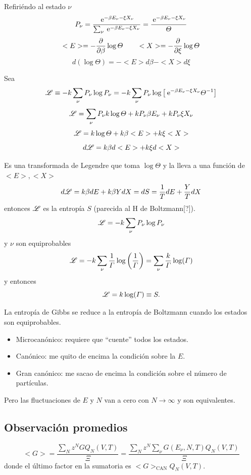 \documentclass[10pt,oneside]{CBFT_book}
\begin{document}
Refiriéndo al estado $ \nu $
\[
	P_\nu = \frac{ \:\mathrm{e}^{-\beta E_\nu - \xi X_\nu } }{ \sum_\nu \:\mathrm{e}^{-\beta E_\nu - \xi X_\nu } } =
	\frac{ \:\mathrm{e}^{-\beta E_\nu - \xi X_\nu }}{\Theta}
\]
\[
	<E> = -\frac{\partial^{\hspace{-0.05em}} {}}{\partial {\beta}^{\hspace{-0.05em}}} \log \Theta  \qquad <X> = -\frac{\partial^{\hspace{-0.05em}} {}}{\partial {\xi}^{\hspace{-0.05em}}} \log \Theta 
\]
\[
	d( \log \Theta ) = -<E> d\beta - <X> d\xi 
\]

Sea 
\[
	\mathscr{L} \equiv -k \sum_\nu P_\nu \log P_\nu =
	-k \sum_\nu P_\nu \log \left[ \:\mathrm{e}^{-\beta E_\nu - \xi X_\nu } \Theta^{-1} \right]
\]
\[
	\mathscr{L} = \sum_\nu P_\nu k \log \Theta + k P_\nu \beta E_\nu + k P_\nu \xi X_\nu
\]
\[
	\mathscr{L} = k\log \Theta + k\beta <E> + k\xi <X>
\]
\[
	d\mathscr{L} = k\beta d<E> + k\xi d<X>
\]

Es una transformada de Legendre que toma $\log \Theta$ y la lleva a una función de $ <E>, <X> $
\[
	d\mathscr{L} = k \beta dE + k \beta Y dX = dS = \frac{1}{T}dE + \frac{Y}{T} dX 
\]
entonces $\mathscr{L}$ es la entropía $S$ (parecida al H de Boltzmann[?]).
\[
	\mathscr{L} = -k \sum_\nu P_\nu \log P_\nu 
\]
y $\nu$ son equiprobables
\[
	\mathscr{L} = -k \sum_\nu \frac{1}{\Gamma} \log \left( \frac{1}{\Gamma} \right) = 
	\sum_\nu \frac{k}{\Gamma} \log(\Gamma)
\]
y entonces
\[
	\mathscr{L} = k \log( \Gamma ) \equiv S.
\]

La entropía de Gibbs se reduce a la entropía de Boltzmann cuando los estados son equiprobables.

\begin{itemize}
 \item Microcanónico: requiere que ``cuente'' todos los estados.
 \item Canónico: me quito de encima la condición sobre la $E$.
 \item Gran canónico: me sacao de encima la condición sobre el número de partículas.
\end{itemize}

Pero las fluctuaciones de $E$ y $N$ van a cero con $N \to \infty$ y son equivalentes.


\subsection{Observación promedios}

\[
	<G> = \frac{\sum_N z^N G Q_N(V,T) }{\Xi} = \frac{\sum_N z^N \sum_\nu G(E_\nu, N, T) Q_N(V,T) }{\Xi}
\]
donde el último factor en la sumatoria es $<G>_{\text{CAN}} Q_N(V,T)$.
\end{document}
